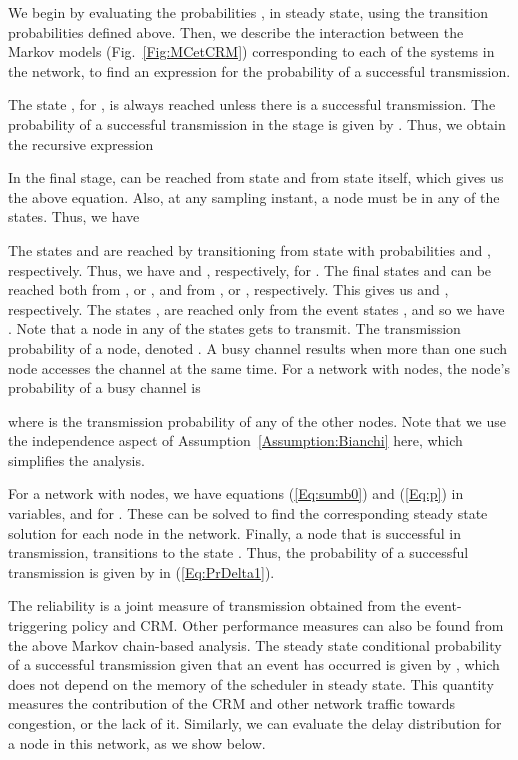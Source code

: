 \documentclass[journal]{IEEEtran}
\begin{document}
\begin{IEEEproof}
We begin by evaluating the probabilities , in steady state, using the transition probabilities defined above. Then, we describe the interaction between the Markov models (Fig.~\ref{Fig:MCetCRM}) corresponding to each of the systems in the network, to find an expression for the probability of a successful transmission.

The state , for , is always reached unless there is a successful transmission. The probability of a successful transmission in the  stage is given by . Thus, we obtain the recursive expression

In the final stage,  can be reached from state  and from state  itself, which gives us the above equation. Also, at any sampling instant, a node must be in any of the  states. Thus, we have


The states  and  are reached by transitioning from state  with probabilities  and , respectively. Thus, we have  and , respectively, for . The final states  and  can be reached both from , or , and from , or , respectively. This gives us  and , respectively. The states , are reached only from the event states , and so we have . Note that a node in any of the  states gets to transmit. The transmission probability of a node, denoted . A busy channel results when more than one such node accesses the channel at the same time. For a network with  nodes, the  node's probability of a busy channel is

where  is the transmission probability of any of the other  nodes. Note that we use the independence aspect of Assumption~\ref{Assumption:Bianchi} here, which simplifies the analysis.

For a network with  nodes, we have  equations (\ref{Eq:sumb0}) and (\ref{Eq:p}) in  variables,  and  for . These can be solved to find the corresponding steady state solution for each node in the network. Finally, a node that is successful in transmission, transitions to the state . Thus, the probability of a successful transmission is given by  in (\ref{Eq:PrDelta1}).
\end{IEEEproof}

The reliability is a joint measure of transmission obtained from the event-triggering policy and CRM. Other performance measures can also be found from the above Markov chain-based analysis. The steady state conditional probability of a successful transmission given that an event has occurred is given by , which does not depend on the memory of the scheduler in steady state. This quantity measures the contribution of the CRM and other network traffic towards congestion, or the lack of it. Similarly, we can evaluate the delay distribution for a node in this network, as we show below.
\end{document}
